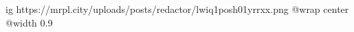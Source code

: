  
 
 
 
 

\ifcmt
  ig https://mrpl.city/uploads/posts/redactor/lwiq1posh01yrrxx.png
  @wrap center
  @width 0.9
\fi
